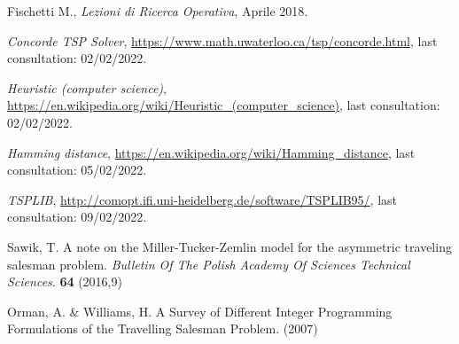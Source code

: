 \begin{thebibliography}{99}


 Fischetti M., \textit{Lezioni di Ricerca Operativa}, Aprile 2018.

 \textit{Concorde TSP Solver}, \url{https://www.math.uwaterloo.ca/tsp/concorde.html}, last consultation: 02/02/2022.

 \textit{Heuristic (computer science)}, \url{https://en.wikipedia.org/wiki/Heuristic_(computer_science)}, last consultation: 02/02/2022.

 \textit{Hamming distance}, \url{https://en.wikipedia.org/wiki/Hamming_distance}, last consultation: 05/02/2022.

 \textit{TSPLIB}, \url{http://comopt.ifi.uni-heidelberg.de/software/TSPLIB95/}, last consultation: 09/02/2022.

Sawik, T. A note on the Miller-Tucker-Zemlin model for the asymmetric traveling salesman problem. {\em Bulletin Of The Polish Academy Of Sciences Technical Sciences}. \textbf{64} (2016,9)

Orman, A. \& Williams, H. A Survey of Different Integer Programming Formulations of the Travelling Salesman Problem.  (2007)




\end{thebibliography}

